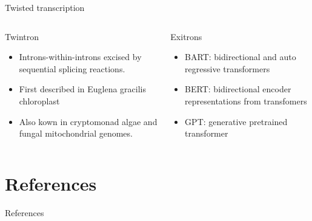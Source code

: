 \documentclass[10pt]{beamer}
\begin{document}

\begin{frame}{Twisted transcription}
\begin{columns}[T,onlytextwidth]
	
	\begin{alertblock}{Twintron}
		\begin{itemize}
			\item Introns-within-introns excised by sequential splicing reactions. 
			\item First described in Euglena gracilis chloroplast
			\item Also kown in cryptomonad algae and fungal mitochondrial genomes.
		\end{itemize}
	\end{alertblock}

		
	\begin{alertblock}{Exitrons}
		\begin{itemize}
			\item BART: bidirectional and auto regressive transformers
			\item BERT: bidirectional encoder representations from transfomers
			\item GPT: generative pretrained transformer
		\end{itemize}

	\end{alertblock}
\end{columns}
\end{frame}





\appendix
\section{References}
\begin{frame}[allowframebreaks]{References}
\begingroup
\tiny \selectfont
\printbibliography[heading=none]
\endgroup
\end{frame}
\end{document}

